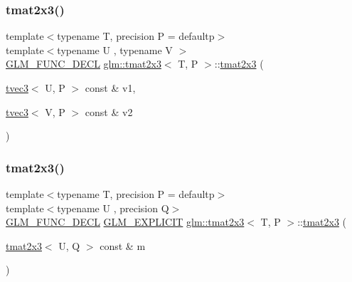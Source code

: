 \mbox{\label{structglm_1_1tmat2x3_a7155a096b04a8577bbfc344a163b07c5}} 
\subsubsection{\texorpdfstring{tmat2x3()}{tmat2x3()}\hspace{0.1cm}{\footnotesize\ttfamily [9/22]}}
{\footnotesize\ttfamily template$<$typename T, precision P = defaultp$>$ \\
template$<$typename U , typename V $>$ \\
\mbox{\hyperlink{setup_8hpp_ab2d052de21a70539923e9bcbf6e83a51}{G\+L\+M\+\_\+\+F\+U\+N\+C\+\_\+\+D\+E\+CL}} \mbox{\hyperlink{structglm_1_1tmat2x3}{glm\+::tmat2x3}}$<$ T, P $>$\+::\mbox{\hyperlink{structglm_1_1tmat2x3}{tmat2x3}} (\begin{DoxyParamCaption}\item[{\mbox{\hyperlink{structglm_1_1tvec3}{tvec3}}$<$ U, P $>$ const \&}]{v1,  }\item[{\mbox{\hyperlink{structglm_1_1tvec3}{tvec3}}$<$ V, P $>$ const \&}]{v2 }\end{DoxyParamCaption})}

\mbox{\label{structglm_1_1tmat2x3_a5cd6c10b4d3a99be39f63ccbcc57b210}} 
\subsubsection{\texorpdfstring{tmat2x3()}{tmat2x3()}\hspace{0.1cm}{\footnotesize\ttfamily [10/22]}}
{\footnotesize\ttfamily template$<$typename T, precision P = defaultp$>$ \\
template$<$typename U , precision Q$>$ \\
\mbox{\hyperlink{setup_8hpp_ab2d052de21a70539923e9bcbf6e83a51}{G\+L\+M\+\_\+\+F\+U\+N\+C\+\_\+\+D\+E\+CL}} \mbox{\hyperlink{setup_8hpp_a6c74f5a5e7b134ab69023ff9a30d4d5d}{G\+L\+M\+\_\+\+E\+X\+P\+L\+I\+C\+IT}} \mbox{\hyperlink{structglm_1_1tmat2x3}{glm\+::tmat2x3}}$<$ T, P $>$\+::\mbox{\hyperlink{structglm_1_1tmat2x3}{tmat2x3}} (\begin{DoxyParamCaption}\item[{\mbox{\hyperlink{structglm_1_1tmat2x3}{tmat2x3}}$<$ U, Q $>$ const \&}]{m }\end{DoxyParamCaption})}

